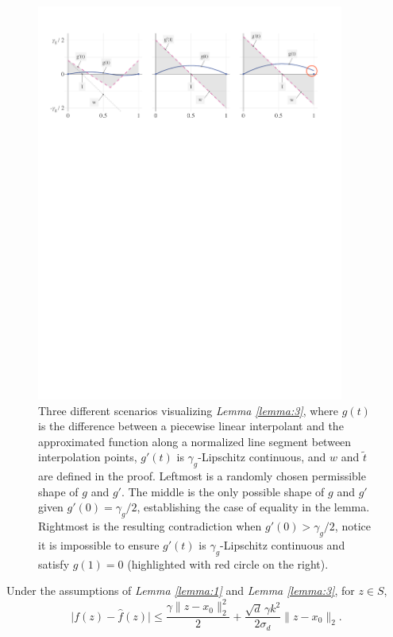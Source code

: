 \begin{figure}
  \centering
  \includegraphics[width=0.9\textwidth,]{Figures/NA/example_lemma_3.pdf}
  \def\g{\gamma_g}
  \caption{Three different scenarios visualizing {\it
      Lemma \ref{lemma:3}}, where $g(t)$ is the difference between a
    piecewise linear interpolant and the approximated function along a
    normalized line segment between interpolation points, $g'(t)$ is
    $\g$-Lipschitz continuous, and $w$ and $\tilde t$ are defined in
    the proof. Leftmost is a randomly chosen permissible shape of $g$
    and $g'$. The middle is the only possible shape of $g$ and $g'$
    given $g'(0) = \g / 2$, establishing the case of equality in the
    lemma. Rightmost is the resulting contradiction when $g'(0) > \g /
    2$, notice it is impossible to ensure $g'(t)$ is $\g$-Lipschitz
    continuous and satisfy $g(1) = 0$ (highlighted with red circle on
    the right).
  \vspace{-.1cm}}
  \label{fig:lemma3}
\end{figure}


\begin{onetheorem}
  Under the assumptions of {\it Lemma \ref{lemma:1}} and {\it Lemma
    \ref{lemma:3}}, for $z \in S$,
  $$ \big|f(z) - \hat f(z)\big| \leq \frac{\gamma \|z - x_0\|_2^2}{2} + \frac{\sqrt{d} \, \gamma k^2}{2 \sigma_d} \|z - x_0\|_2.$$
\end{onetheorem}

